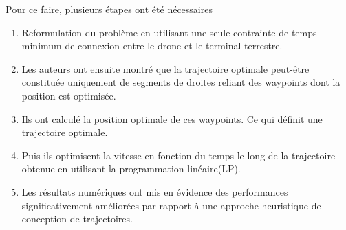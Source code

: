 \documentclass[utf8, a4paper]{beamer}
\begin{document}
\begin{frame} {}
 Pour ce faire, plusieurs étapes ont été nécessaires\pause

\begin{enumerate}
	\item Reformulation du problème en utilisant une seule contrainte
	de temps minimum de connexion entre le drone et le terminal terrestre.
	\pause
	
	\item Les auteurs ont ensuite montré que la trajectoire optimale
	peut-être constituée uniquement de segments de droites reliant des
	waypoints dont la position est optimisée.
	\pause
	\item Ils ont calculé la position optimale de ces waypoints.
	Ce qui définit une trajectoire optimale. 
	\pause  
	\item Puis ils optimisent la vitesse en fonction du temps le long de la trajectoire obtenue
	en utilisant la programmation linéaire(LP).
	\pause
	\item Les résultats numériques ont mis en évidence des performances significativement améliorées
	 par rapport à une approche heuristique de conception de trajectoires.
	 
\end{enumerate}
\end{frame}







%
%
\end{document}

